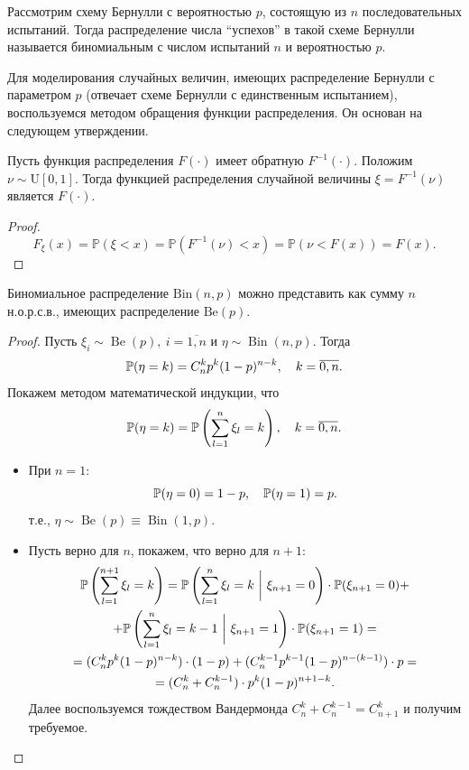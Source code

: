\documentclass[11pt]{report}
\DeclareMathOperator{\Bin}{Bin}
\DeclareMathOperator{\Be}{Be}
\begin{document}
\begin{definition}
Рассмотрим схему Бернулли с вероятностью $p$, состоящую из $n$ последовательных испытаний. Тогда распределение числа ``успехов'' в такой схеме Бернулли называется биномиальным с числом испытаний $n$ и вероятностью $p$.
\end{definition}

Для моделирования случайных величин, имеющих распределение Бернулли с параметром $p$ (отвечает схеме Бернулли с единственным испытанием), воспользуемся методом обращения функции распределения. Он основан на следующем утверждении.

\begin{statement}
Пусть функция распределения $F(\cdot)$ имеет обратную $F^{-1}(\cdot)$. Положим $\nu\sim\mathrm{U}[0,1]$. Тогда функцией распределения случайной величины $\xi=F^{-1}(\nu)$ является $F(\cdot)$.
\end{statement}
\begin{proof}
$$
F_\xi(x) = \mathbb{P}(\xi < x) = \mathbb{P}(F^{-1}(\nu) < x) = \mathbb{P}(\nu < F(x)) = F(x).
$$
\end{proof}



\begin{statement}
Биномиальное распределение $\mathrm{Bin}(n,p)$ можно представить как сумму $n$ н.о.р.с.в., имеющих распределение $\mathrm{Be}(p)$.
\end{statement}
\begin{proof}
Пусть $\xi_i\sim\Be(p),~i=\overline{1,n}$ и $\eta\sim\Bin(n,p)$. Тогда
\[
\mathbb{P}(\eta = k) = C_n^kp^k(1-p)^{n-k},\quad k=\overline{0,n}.
\]
Покажем методом математической индукции, что 
\[
\mathbb{P}(\eta = k) = \mathbb{P}\left(\sum_{l=1}^n\xi_l = k\right),\quad k=\overline{0,n}.
\]
\begin{itemize}
\item При $n=1$:
\[
\mathbb{P}(\eta = 0) = 1-p, \quad\mathbb{P}(\eta = 1) = p.
\]
т.е., $\eta\sim\Be(p)\equiv\Bin(1,p)$.
\item Пусть верно для $n$, покажем, что верно для $n+1$:
\begin{gather*}
\mathbb{P}\left(\sum^{n+1}_{l=1}\xi_l=k\right) = 
\mathbb{P}\left(\sum^{n}_{l=1}\xi_l=k~\bigg|~\xi_{n+1}=0\right)\cdot
\mathbb{P}(\xi_{n+1}=0) + \\
+ \mathbb{P}\left(\sum^{n}_{l=1}\xi_l=k-1~\bigg|~\xi_{n+1}=1\right)\cdot
\mathbb{P}(\xi_{n+1}=1) = \\
= (C_n^kp^k(1-p)^{n-k})\cdot (1-p) + (C_n^{k-1}p^{k-1}(1-p)^{n-(k-1)})\cdot p = \\
= (C_n^k + C_n^{k-1})\cdot p^{k}(1-p)^{n+1-k}.
\end{gather*}
Далее воспользуемся тождеством Вандермонда $C_n^k + C_n^{k-1} = C_{n+1}^k$ и получим требуемое.
\end{itemize}
\end{proof}
\end{document}

